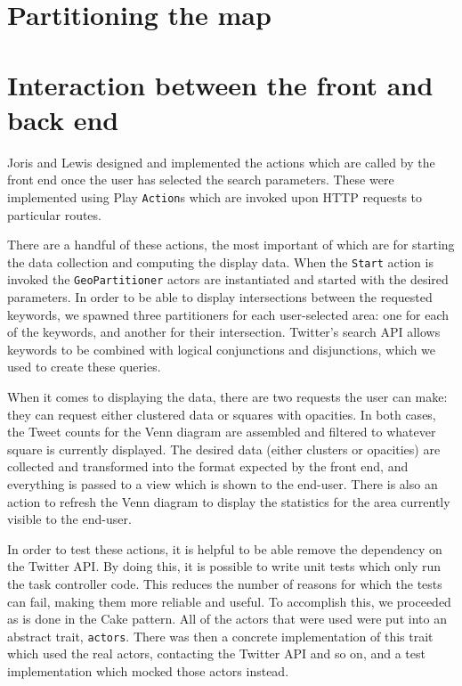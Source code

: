 \section{Partitioning the map}

\section{Interaction between the front and back end}

Joris and Lewis designed and implemented the actions which are called by the
front end once the user has selected the search parameters.  These were
implemented using Play \verb+Action+s which are invoked upon HTTP requests to
particular routes.

There are a handful of these actions, the most important of which are for
starting the data collection and computing the display data.  When the
\verb+Start+ action is invoked the \verb+GeoPartitioner+ actors are
instantiated and started with the desired parameters.  In order to be able to
display intersections between the requested keywords, we spawned three
partitioners for each user-selected area: one for each of the keywords, and
another for their intersection.  Twitter's search API allows keywords to be
combined with logical conjunctions and disjunctions, which we used to create
these queries.

When it comes to displaying the data, there are two requests the user can make:
they can request either clustered data or squares with opacities.  In both
cases, the Tweet counts for the Venn diagram are assembled and filtered to
whatever square is currently displayed.  The desired data (either clusters or
opacities) are collected and transformed into the format expected
by the front end, and everything is passed to a view which is shown to the
end-user.  There is also an action to refresh the Venn diagram to display the
statistics for the area currently visible to the end-user.

In order to test these actions, it is helpful to be able remove the dependency
on the Twitter API.  By doing this, it is possible to write unit tests which
only run the task controller code.  This reduces the number of reasons for which
the tests can fail, making them more reliable and useful.  To accomplish this,
we proceeded as is done in the Cake pattern.  All of the actors that were used
were put into an abstract trait, \verb+actors+.  There was then a concrete
implementation of this trait which used the real actors, contacting the Twitter
API and so on, and a test implementation which mocked those actors instead.
